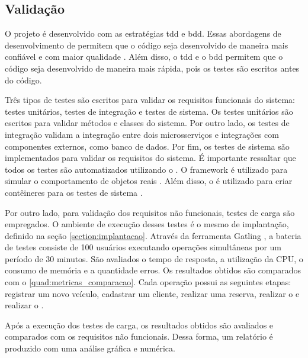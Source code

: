 \subsection{Validação}
O projeto é desenvolvido com as estratégias \acrfull{tdd} e \acrfull{bdd}. Essas abordagens de desenvolvimento de  permitem que o código seja desenvolvido de maneira mais confiável e com maior qualidade \cite{barauna2020tdd}. Além disso, o \acrshort{tdd} e o \acrshort{bdd} permitem que o código seja desenvolvido de maneira mais rápida, pois os testes são escritos antes do código.

Três tipos de testes são escritos para validar os requisitos funcionais do sistema: testes unitários, testes de integração e testes de sistema. Os testes unitários são escritos para validar métodos e classes do sistema. Por outro lado, os testes de integração validam a integração entre dois microsserviços e integrações com componentes externos, como banco de dados. Por fim, os testes de sistema são implementados para validar os requisitos do sistema. É importante ressaltar que todos os testes são automatizados utilizando o  \cite{junit}. O framework  é utilizado para simular o comportamento de objetos reais \cite{mockito}. Além disso, o  é utilizado para criar contêineres  para os testes de sistema \cite{testcontainers}.

Por outro lado, para validação dos requisitos não funcionais, testes de carga são empregados. O ambiente de execução desses testes é o mesmo de implantação, definido na seção \ref{section:implantacao}. Através da ferramenta Gatling \cite{gatling}, a bateria de testes consiste de 100 usuários executando operações simultâneas por um período de 30 minutos. São avaliados o tempo de resposta, a utilização da CPU, o consumo de memória e a quantidade erros. Os resultados obtidos são comparados com o \autoref{quad:metricas_comparacao}. Cada operação possui as seguintes etapas: registrar um novo veículo, cadastrar um cliente, realizar uma reserva, realizar o  e realizar o .

Após a execução dos testes de carga, os resultados obtidos são avaliados e comparados com os requisitos não funcionais. Dessa forma, um relatório é produzido com uma análise gráfica e numérica.

